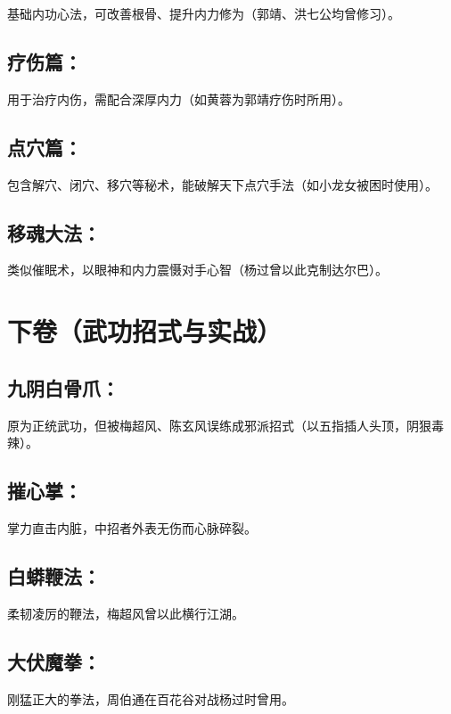 \documentclass[doctor, vlined, ]{DissertUESTC}
\begin{document}
	基础内功心法，可改善根骨、提升内力修为（郭靖、洪七公均曾修习）。

	\subsection{疗伤篇：}

	用于治疗内伤，需配合深厚内力（如黄蓉为郭靖疗伤时所用）。

	\subsection{点穴篇：}

	包含解穴、闭穴、移穴等秘术，能破解天下点穴手法（如小龙女被困时使用）。

	\subsection{移魂大法：}

	类似催眠术，以眼神和内力震慑对手心智（杨过曾以此克制达尔巴）。

	\section{下卷（武功招式与实战）}
	
	\subsection{九阴白骨爪：}

	原为正统武功，但被梅超风、陈玄风误练成邪派招式（以五指插人头顶，阴狠毒辣）。

	\subsection{摧心掌：}

	掌力直击内脏，中招者外表无伤而心脉碎裂。

	\subsection{白蟒鞭法：}

	柔韧凌厉的鞭法，梅超风曾以此横行江湖。

	\subsection{大伏魔拳：}

	刚猛正大的拳法，周伯通在百花谷对战杨过时曾用。
\end{document}
